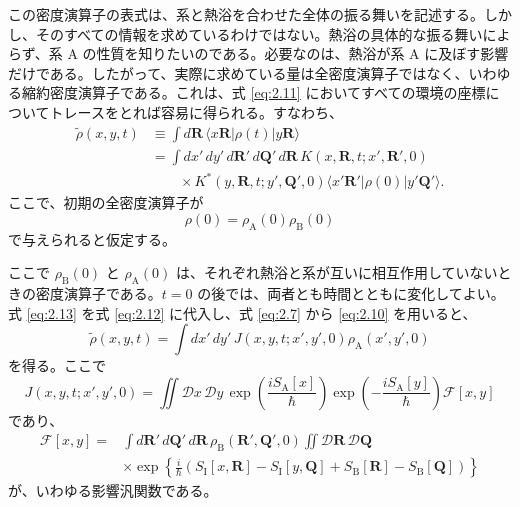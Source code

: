 この密度演算子の表式は、系と熱浴を合わせた全体の振る舞いを記述する。しかし、そのすべての情報を求めているわけではない。熱浴の具体的な振る舞いによらず、系 A の性質を知りたいのである。必要なのは、熱浴が系 A に及ぼす影響だけである。したがって、実際に求めている量は全密度演算子ではなく、いわゆる縮約密度演算子である\cite{ref03,ref12,ref13}。これは、式 \eqref{eq:2.11} においてすべての環境の座標についてトレースをとれば容易に得られる。すなわち、
\begin{equation}
 \begin{aligned}
 \widetilde\rho(x,y,t)
 &\equiv\int d\bm R\,\langle x\bm R|\rho(t)|y\bm R\rangle\\
 &=\int dx'\,dy'\,d\bm R'\,d\bm Q'\,d\bm R\,
 K(x,\bm R,t;x',\bm R',0)\\
 &\qquad\times K^*(y,\bm R,t;y',\bm Q',0)
 \langle x'\bm R'|\rho(0)|y'\bm Q'\rangle.
 \end{aligned}
 \tag{2.12}\label{eq:2.12}
\end{equation}
ここで、初期の全密度演算子が
\begin{equation}
 \rho(0)=\rho_{\mathrm A}(0)\rho_{\mathrm B}(0)
 \tag{2.13}\label{eq:2.13}
\end{equation}
で与えられると仮定する。

ここで $\rho_{\mathrm B}(0)$ と $\rho_{\mathrm A}(0)$ は、それぞれ熱浴と系が互いに相互作用していないときの密度演算子である。$t=0$ の後では、両者とも時間とともに変化してよい。式 \eqref{eq:2.13} を式 \eqref{eq:2.12} に代入し、式 \eqref{eq:2.7} から \eqref{eq:2.10} を用いると、
\begin{equation}
 \widetilde\rho(x,y,t)=\int dx'\,dy'\,
 J(x,y,t;x',y',0)\rho_{\mathrm A}(x',y',0)
 \tag{2.14}\label{eq:2.14}
\end{equation}
を得る。ここで
\begin{equation}
 J(x,y,t;x',y',0)=\iint\mathcal D x\,\mathcal D y\,
 \exp\left(\frac{iS_{\mathrm A}[x]}{\hbar}\right)
 \exp\left(-\frac{iS_{\mathrm A}[y]}{\hbar}\right)\mathcal F[x,y]
 \tag{2.15}\label{eq:2.15}
\end{equation}
であり、
\begin{equation}
 \begin{aligned}
 \mathcal F[x,y]={}&\int d\bm R'\,d\bm Q'\,d\bm R\,
 \rho_{\mathrm B}(\bm R',\bm Q',0)\iint\mathcal D\bm R\,\mathcal D\bm Q\\
 &\times\exp\left\{\frac{i}{\hbar}\left(
 S_{\mathrm I}[x,\bm R]-S_{\mathrm I}[y,\bm Q]
 +S_{\mathrm B}[\bm R]-S_{\mathrm B}[\bm Q]\right)\right\}
 \end{aligned}
 \tag{2.16}\label{eq:2.16}
\end{equation}
が、いわゆる影響汎関数である\cite{ref22,ref23}。

